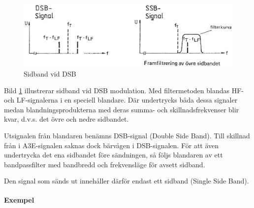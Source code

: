 \begin{figure}
\includegraphics[width=\textwidth]{images/cropped_pdfs/bild_2_1-27.pdf}
\caption{Sidband vid DSB}
\label{fig:BildII1-27}
\end{figure}

Bild \ref{fig:BildII1-27} illustrerar sidband vid DSB modulation.
Med filtermetoden blandas HF- och LF-signalerna i en speciell blandare.
Där undertrycks båda dessa signaler medan blandningsprodukterna med deras summa-
och skillnadsfrekvenser blir kvar, d.v.s. det övre och nedre sidbandet.

Utsignalen från blandaren benämns DSB-signal (Double Side Band).
Till skillnad från i A3E-signalen saknas dock bärvågen i DSB-signalen.
För att även undertrycka det ena sidbandet före sändningen, så följs blandaren
av ett bandpassfilter med bandbredd och frekvensläge för avsett sidband.

Den signal som sänds ut innehåller därför endast ett sidband (Single Side Band).

\paragraph{Exempel}

